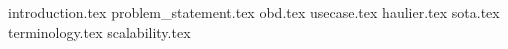 {introduction.tex}
{problem_statement.tex}
{obd.tex}
{usecase.tex}
{haulier.tex}
{sota.tex}
{terminology.tex}
{scalability.tex}

